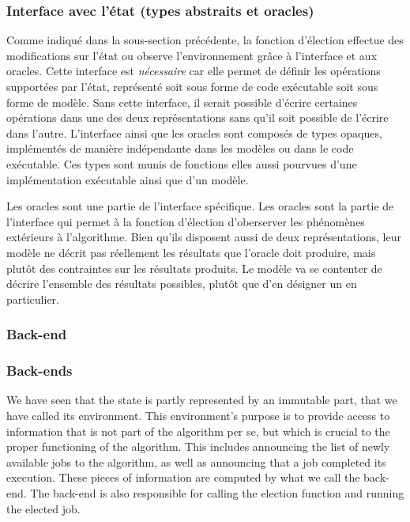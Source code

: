 		\subsubsection{Interface avec l'état (types abstraits et oracles)}
			
			Comme indiqué dans la sous-section précédente, la fonction d'élection effectue des modifications sur l'état ou observe l'environnement grâce à l'interface et aux oracles. Cette interface est \emph{nécessaire} car elle permet de définir les opérations supportées par l'état, représenté soit sous forme de code exécutable soit sous forme de modèle. Sans cette interface, il serait possible d'écrire certaines opérations dans une des deux représentations sans qu'il soit possible de l'écrire dans l'autre.
			L'interface ainsi que les oracles sont composés de types opaques, implémentés de manière indépendante dans les modèles ou dans le code exécutable. Ces types sont munis de fonctions elles aussi pourvues d'une implémentation exécutable ainsi que d'un modèle.

			Les oracles sont une partie de l'interface spécifique. Les oracles sont la partie de l'interface qui permet à la fonction d'élection d'oberserver les phénomènes extérieurs à l'algorithme. Bien qu'ils disposent aussi de deux représentations, leur modèle ne décrit pas réellement les résultats que l'oracle doit produire, mais plutôt des contraintes sur les résultats produits. Le modèle va se contenter de décrire l'ensemble des résultats possibles, plutôt que d'en désigner un en particulier.

			\subsubsection{Back-end}
		\subsubsection{Back-ends}
		\label{sec:back-ends}

		

		We have seen that the state is partly represented by an immutable part, that we have called its environment. This environment's purpose is to provide access to information that is not part of the algorithm per se, but which is crucial to the proper functioning of the algorithm. This includes announcing the list of newly available jobs to the algorithm, as well as announcing that a job completed its execution. These pieces of information are computed by what we call the back-end. The back-end is also responsible for calling the election function and running the elected job.

